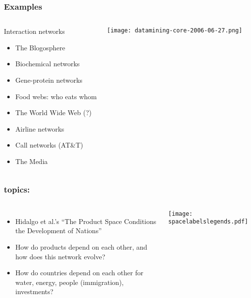\begin{frame}
  \frametitle{Examples}

  \begin{columns}
    \begin{block}{Interaction networks}
      \begin{itemize}
      \item<1->  The Blogosphere
      \item<2->  Biochemical networks
      \item<3->  Gene-protein networks
      \item<4->  Food webs: who eats whom
      \item<5->  The World Wide Web (?)
      \item<6->  Airline networks
      \item<7->  Call networks (AT\&T)
      \item<8->  The Media
      \end{itemize}
    \end{block}
    \texttt{[image: datamining-core-2006-06-27.png]}\\
    {\tiny {}}
  \end{columns}

\end{frame}

\begin{frame}
  \frametitle{topics:}

  \begin{block}{}
    \begin{columns}
      \begin{itemize}
      \item 
        Hidalgo et al.'s ``The Product Space Conditions the Development of Nations''\cite{hidalgo2007a}
      \item 
        How do products depend on each other, and how does this network evolve?
      \item 
        How do countries depend on
        each other for water, energy, people (immigration), investments?
      \end{itemize}      
      \texttt{[image: spacelabelslegends.pdf]}
    \end{columns}
  \end{block}

\end{frame}

